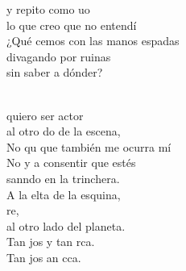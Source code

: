 \documentclass[12pt]{article}
\begin{document}
\begin{multicols*}{2}
\begin{cancion}
	y repito como uo\\
	lo que creo que no entendí \\
	¿Qué cemos con las manos espadas\\
	divagando por ruinas \\
	sin saber a dónder?\\\jump\\
	\begin{chorus}%
	 quiero ser actor\\
	al otro do de la escena,\\
	No qu que también me ocurra mí\\
	No y a consentir que estés \\
	sanndo en la trinchera.\\
	A la elta de la esquina,\\
        re,\\
al otro lado del planeta.\\
	Tan jos y tan rca.\\
	Tan jos an cca.\\
	\end{chorus}%
	\jump\\
\end{cancion}%


\end{multicols*}
\end{document}

